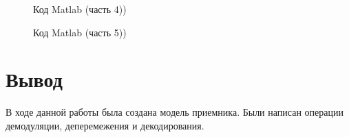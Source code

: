 \documentclass[12pt,a4paper]{scrartcl}
\begin{document}
\label{sec:part4}
\begin{figure}[h!]
\caption{Код Matlab (часть 4))}
\end{figure}

\label{sec:part5}
\begin{figure}[h!]
\caption{Код Matlab (часть 5))}
\end{figure}

\clearpage
\newpage

\section{Вывод}
\label{sec:afterWork}
В ходе данной работы была создана модель приемника. Были написан операции демодуляции, деперемежения и декодирования. 
\end{document}
